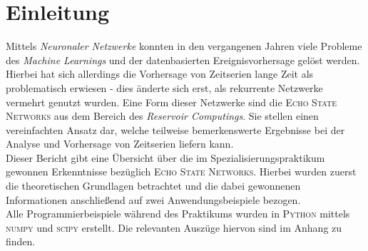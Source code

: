 \section{Einleitung}
Mittels \textit{Neuronaler Netzwerke} konnten in den vergangenen Jahren viele Probleme des \textit{Machine Learnings} und der datenbasierten Ereignisvorhersage gelöst werden. Hierbei hat sich allerdings die Vorhersage von Zeitserien lange Zeit als problematisch erwiesen - dies änderte sich erst, als rekurrente Netzwerke vermehrt genutzt wurden. Eine Form dieser Netzwerke sind die \textsc{Echo State Networks} aus dem Bereich des \textit{Reservoir Computings}. Sie stellen einen vereinfachten Ansatz dar, welche teilweise bemerkenswerte Ergebnisse bei der Analyse und Vorhersage von Zeitserien liefern kann.\\  

Dieser Bericht gibt eine Übersicht über die im Spezialisierungspraktikum gewonnen Erkenntnisse bezüglich \textsc{Echo State Networks}. Hierbei wurden zuerst die theoretischen Grundlagen betrachtet und die dabei gewonnenen Informationen anschließend auf zwei Anwendungsbeispiele bezogen.\\

Alle Programmierbeispiele während des Praktikums wurden in \textsc{Python} mittels \textsc{numpy} und \textsc{scipy} erstellt. Die relevanten Auszüge hiervon sind im Anhang zu finden.